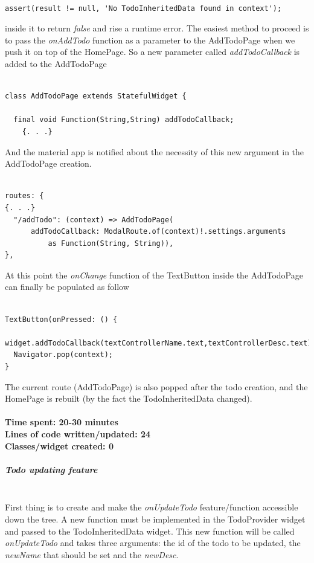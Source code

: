\begin{verbatim}

assert(result != null, 'No TodoInheritedData found in context');
\end{verbatim}

inside it to return \textit{false} and rise a runtime error. The easiest method to proceed is to pass the \textit{onAddTodo} function as a parameter to the AddTodoPage when we push it on top of the HomePage. So a new parameter called \textit{addTodoCallback }is added to the AddTodoPage 
\mbox{}\\


\begin{verbatim}

class AddTodoPage extends StatefulWidget {

  final void Function(String,String) addTodoCallback;
    {. . .}
\end{verbatim}

And the material app is notified about the necessity of this new argument in the AddTodoPage creation.
\mbox{}\\


\begin{verbatim}

routes: {
{. . .}
  "/addTodo": (context) => AddTodoPage(
      addTodoCallback: ModalRoute.of(context)!.settings.arguments
          as Function(String, String)),
},

\end{verbatim}

At this point the \textit{onChange  }function of the TextButton inside the AddTodoPage can finally be populated as follow
\mbox{}\\


\begin{verbatim}

TextButton(onPressed: () {
  widget.addTodoCallback(textControllerName.text,textControllerDesc.text);
  Navigator.pop(context);
}
\end{verbatim}

The current route (AddTodoPage) is also popped after the todo creation, and the HomePage is rebuilt (by the fact the TodoInheritedData changed).\\
\\
\textbf{Time spent: 20-30 minutes\\
Lines of code written/updated: 24\\ 
Classes/widget created: 0\\
}
\subparagraph{Todo updating feature} \mbox{} \\
\label{subpar:todo_updating_feature_inherited_wdiget}
First thing is to create and make the \textit{onUpdateTodo } feature/function accessible down the tree. A new function must be implemented in the TodoProvider widget and passed to the TodoInheritedData widget. This new function will be called \textit{onUpdateTodo } and takes three arguments: the id of the todo to be updated, the \textit{newName } that should be set and the \textit{newDesc}.

